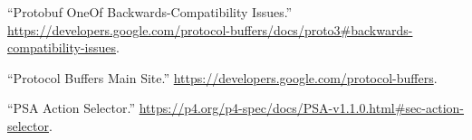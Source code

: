 \documentclass[11pt]{article}
\begin{document}
{{\begin{thebibliography}{45}
\mdbibitemlabel{{}[25]}\textquotedblleft{}Protobuf OneOf Backwards-Compatibility Issues.\textquotedblright{} \href{https://developers.google.com/protocol-buffers/docs/proto3\%23backwards-compatibility-issues}{{\ttfamily https://\hspace{0pt}developers.\hspace{0pt}google.\hspace{0pt}com/\hspace{0pt}protocol-\hspace{0pt}buffers/\hspace{0pt}docs/\hspace{0pt}proto3\#\hspace{0pt}backwards-\hspace{0pt}compatibility-\hspace{0pt}issues}}.\label{protooneofbackwardscompatibility}%

\mdbibitemlabel{{}[26]}\textquotedblleft{}Protocol Buffers Main Site.\textquotedblright{} \href{https://developers.google.com/protocol-buffers}{{\ttfamily https://\hspace{0pt}developers.\hspace{0pt}google.\hspace{0pt}com/\hspace{0pt}protocol-\hspace{0pt}buffers}}.\label{proto}%

\mdbibitemlabel{{}[27]}\textquotedblleft{}PSA Action Selector.\textquotedblright{} \href{https://p4.org/p4-spec/docs/PSA-v1.1.0.html\%23sec-action-selector}{{\ttfamily https://\hspace{0pt}p4.\hspace{0pt}org/\hspace{0pt}p4-\hspace{0pt}spec/\hspace{0pt}docs/\hspace{0pt}PSA-\hspace{0pt}v1.\hspace{0pt}1.\hspace{0pt}0.\hspace{0pt}html\#\hspace{0pt}sec-\hspace{0pt}action-\hspace{0pt}selector}}.\label{psaactionselector}%


\end{thebibliography}}}
\end{document}
